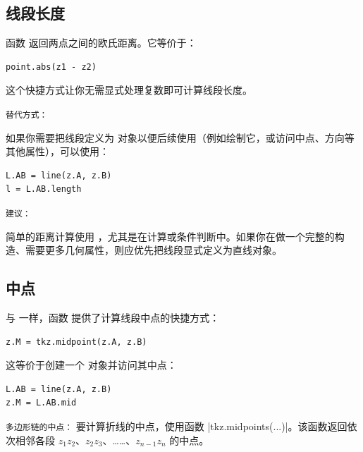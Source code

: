 \subsection{线段长度}
\label{sub:length_of_a_segment}

函数  返回两点之间的欧氏距离。它等价于：

\begin{mybox}
\begin{verbatim}
point.abs(z1 - z2)
\end{verbatim}
\end{mybox}

这个快捷方式让你无需显式处理复数即可计算线段长度。

\medskip
\texttt{替代方式：}

如果你需要把线段定义为  对象以便后续使用（例如绘制它，或访问中点、方向等其他属性），可以使用：

\begin{mybox}
\begin{verbatim}
L.AB = line(z.A, z.B)
l = L.AB.length
\end{verbatim}
\end{mybox}

\medskip
\texttt{建议：}

简单的距离计算使用 ，尤其是在计算或条件判断中。如果你在做一个完整的构造、需要更多几何属性，则应优先把线段显式定义为直线对象。

\subsection{中点}
\label{sub:midpoint_and_midpoints}

与  一样，函数  提供了计算线段中点的快捷方式：

\begin{mybox}
\begin{verbatim}
z.M = tkz.midpoint(z.A, z.B)
\end{verbatim}
\end{mybox}

这等价于创建一个  对象并访问其中点：

\begin{mybox}
\begin{verbatim}
L.AB = line(z.A, z.B)
z.M = L.AB.mid
\end{verbatim}
\end{mybox}

\medskip
\texttt{多边形链的中点：}
要计算折线的中点，使用函数 |tkz.midpoints(...)|。该函数返回依次相邻各段 $z_1z_2$、$z_2z_3$、……、$z_{n-1}z_n$ 的中点。

